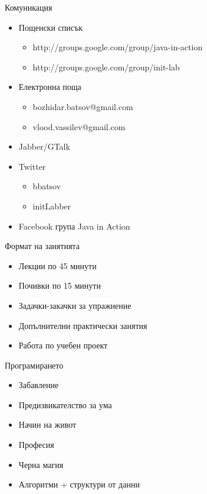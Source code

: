 \documentclass{beamer}
\begin{document}
\begin{frame}{Комуникация}
  \transdissolve
  \begin{itemize}
  \item Пощенски списък 
    \begin{itemize}
    \item http://groups.google.com/group/java-in-action
    \item http://groups.google.com/group/init-lab
    \end{itemize}
  \item Електронна поща
    \begin{itemize}
      \item bozhidar.batsov@gmail.com
      \item vlood.vassilev@gmail.com
    \end{itemize}
  \item Jabber/GTalk
  \item Twitter
    \begin{itemize}
      \item bbatsov
      \item initLabber
    \end{itemize}
  \item Facebook група Java in Action
  \end{itemize}
\end{frame}

\begin{frame}{Формат на занятията}
  \transdissolve
  \begin{itemize}
  \item Лекции по 45 минути
  \item Почивки по 15 минути
  \item Задачки-закачки за упражнение
  \item Допълнителни практически занятия
  \item Работа по учебен проект
  \end{itemize}
\end{frame}

\begin{frame}{Програмирането}
  \transdissolve
  \begin{itemize}
  \item Забавление
  \item Предизвикателство за ума
  \item Начин на живот
  \item Професия
  \item Черна магия
  \item Алгоритми + структури от данни
  \end{itemize}
\end{frame}
\end{document}
